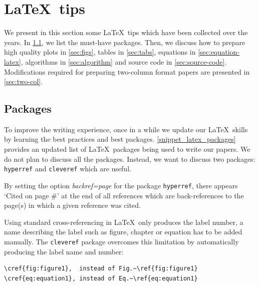 \documentclass[authoryear,12pta4paper,fleqn]{article}
\numberwithin{equation}{section}
\theoremstyle{remark}
\begin{document}
% 


\section{\LaTeX\ tips}\label{sec:latex}

We present in this section some \LaTeX\ tips which have been collected over the years. In \cref{sec:packages}, we list the must-have packages. Then, we discuss how to prepare high quality plots in \cref{sec:figs}, tables in 
\cref{sec:tabs},  equations in \cref{sec:equation-latex}, algorithms in \cref{sec:algorithm} and source code in \cref{sec:source-code}. Modifications required for preparing two-column format papers are presented in \cref{sec:two-col}.

\subsection{Packages}\label{sec:packages}


To improve the writing experience, once in a while we update our \LaTeX\ skills by learning the best practices and best packages. \cref{snippet_latex_packages} provides an updated list of \LaTeX\ packages being used to write our papers.
We do not plan to discuss all the packages. Instead, we want to discuss two packages: \texttt{hyperref} and \texttt{cleveref} which are useful.

By setting the option \textit{backref=page} for the package \texttt{hyperref}, there appears `Cited on page \#' at the end of all references which are back-references  to the page(s)  in which a given reference was cited.


Using standard cross-referencing in \LaTeX\ only produces the label number, a name describing the label such as figure, chapter or equation has to be added manually. The \texttt{cleveref} package overcomes this limitation by automatically producing the label name and number:

\begin{verbatim}
\cref{fig:figure1},  instead of Fig.~\ref{fig:figure1}
\cref{eq:equation1}, instead of Eq.~\ref{eq:equation1}
\end{verbatim}
\end{document}
